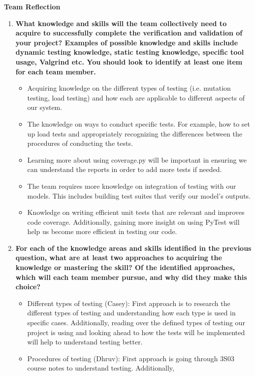 \documentclass[12pt, titlepage]{article}
\begin{document}
\textbf{Team Reflection}
\begin{enumerate}
  \item \textbf{What knowledge and skills will the team collectively need to acquire to
  successfully complete the verification and validation of your project?
  Examples of possible knowledge and skills include dynamic testing knowledge,
  static testing knowledge, specific tool usage, Valgrind etc.  You should look to
  identify at least one item for each team member.}
  \begin{itemize}
    \item Acquiring knowledge on the different types of testing (i.e. mutation testing, load testing) 
    and how each are applicable to different aspects of our system. 
    \item The knowledge on ways to conduct specific tests. For example, how to set up load tests and appropriately
    recognizing the differences between the procedures of conducting the tests. 
    \item Learning more about using coverage.py will be important in ensuring we can understand the reports
    in order to add more tests if needed. 
    \item The team requires more knowledge on integration of testing with our models. This includes building test suites 
    that verify our model's outputs. 
    \item Knowledge on writing efficient unit tests that are relevant and improves code coverage. Additionally, 
    gaining more insight on using PyTest will help us become more efficient in testing our code. 
  \end{itemize}
  \item \textbf{For each of the knowledge areas and skills identified in the previous
  question, what are at least two approaches to acquiring the knowledge or
  mastering the skill?  Of the identified approaches, which will each team
  member pursue, and why did they make this choice?}
  \begin{itemize}
    \item Different types of testing (Casey): First approach is to research the different types of testing and understanding 
    how each type is used in specific cases. Additionally, reading over the defined types of testing our project is using 
    and looking ahead to how the tests will be implemented will help to understand testing better. 
    \item Procedures of testing (Dhruv): First approach is going through 3S03 course notes to understand testing. Additionally, 

\end{itemize}
\end{enumerate}
\end{document}
